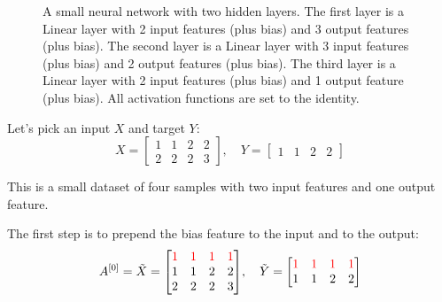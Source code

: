 \begin{figure}[h]
    \centering
    \caption{A small neural network with two hidden layers. The first layer is a Linear layer with 2 input features (plus bias) and 3 output features (plus bias). The second layer is a Linear layer with 3 input features (plus bias) and 2 output features (plus bias). The third layer is a Linear layer with 2 input features (plus bias) and 1 output feature (plus bias). All activation functions are set to the identity.}
    \label{fig:small-nn}
\end{figure}

Let's pick an input $X$ and target $Y$:
\begin{equation*}
    X = \begin{bmatrix}
        1 & 1 & 2 & 2 \\
        2 & 2 & 2 & 3
    \end{bmatrix}, \quad
    Y = \begin{bmatrix}
        1 & 1 & 2 & 2
    \end{bmatrix}
\end{equation*}

This is a small dataset of four samples with two input features and one output feature.

The first step is to prepend the bias feature to the input and to the output:
\begin{equation*}
    A^{[0]} = \tilde{X} = \mqty[
        \color{red} 1 & \color{red} 1 & \color{red} 1 & \color{red} 1 \\
        1 & 1 & 2 & 2 \\
        2 & 2 & 2 & 3
    ], \quad \tilde{Y} = \mqty[
        \color{red} 1 & \color{red} 1 & \color{red} 1 & \color{red} 1 \\
        1 & 1 & 2 & 2
    ]
\end{equation*}

